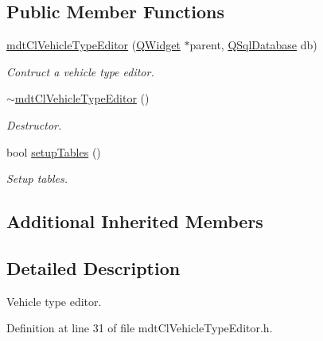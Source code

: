 \subsection*{Public Member Functions}
\begin{DoxyCompactItemize}
\item 
\hyperlink{classmdt_cl_vehicle_type_editor_a739d0601d028fdd5f0ce379a76b27297}{mdt\-Cl\-Vehicle\-Type\-Editor} (\hyperlink{class_q_widget}{Q\-Widget} $\ast$parent, \hyperlink{class_q_sql_database}{Q\-Sql\-Database} db)
\begin{DoxyCompactList}\small\item\em Contruct a vehicle type editor. \end{DoxyCompactList}\item 
\hyperlink{classmdt_cl_vehicle_type_editor_a54ae4a55fea20565cf5ed487704f1864}{$\sim$mdt\-Cl\-Vehicle\-Type\-Editor} ()
\begin{DoxyCompactList}\small\item\em Destructor. \end{DoxyCompactList}\item 
bool \hyperlink{classmdt_cl_vehicle_type_editor_aa23c76e65f52575a31616267757603ae}{setup\-Tables} ()
\begin{DoxyCompactList}\small\item\em Setup tables. \end{DoxyCompactList}\end{DoxyCompactItemize}
\subsection*{Additional Inherited Members}


\subsection{Detailed Description}
Vehicle type editor. 

Definition at line 31 of file mdt\-Cl\-Vehicle\-Type\-Editor.\-h.



